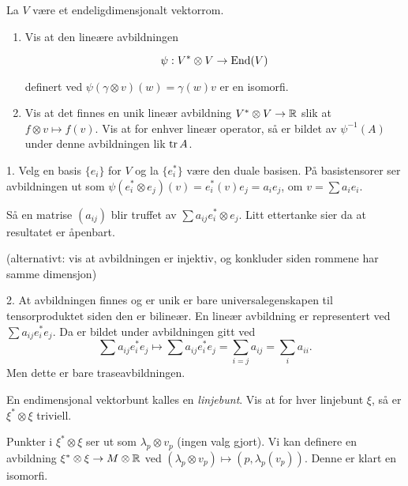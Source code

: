\documentclass[11pt, english]{article}
\begin{document}
\begin{oppg}
La $V$ være et endeligdimensjonalt vektorrom. 
\begin{enumerate}
\item Vis at den lineære avbildningen

\[
\psi: V^\ast \otimes V \to \operatorname{End}(V)
\]

definert ved $\psi(\gamma \otimes v)(w) = \gamma(w) v$ er en isomorfi.
\item Vis at det finnes en unik lineær avbildning $V^\ast \otimes V \to \mathbb{R}$ slik at $f \otimes v \mapsto f(v)$. Vis at for enhver lineær operator, så er bildet av $\psi^{-1}(A)$  under denne avbildningen lik $\operatorname{tr} A$.
\end{enumerate}
\end{oppg}

\begin{losn}
1. Velg en basis $\{ e_i \}$ for $V$ og la $\{ e_i^\ast \}$ være den duale basisen. På basistensorer ser avbildningen ut som $\psi(e_i^\ast \otimes e_j)(v) = e_i^\ast(v) e_j = a_i e_j$, om $v = \sum a_i e_i$. 

Så en matrise $(a_{ij})$ blir truffet av $\sum a_{ij} e_i^\ast \otimes e_j$. Litt ettertanke sier da at resultatet er åpenbart.

(alternativt: vis at avbildningen er injektiv, og konkluder siden rommene har samme dimensjon)

2. At avbildningen finnes og er unik er bare universalegenskapen til tensorproduktet siden den er bilineær. En lineær avbildning er representert ved $\sum a_{ij} e_i^\ast e_j$. Da er bildet under avbildningen gitt ved
$$
\sum a_{ij} e_i^\ast e_j \mapsto \sum a_{ij} e_i^\ast e_j = \sum_{i=j} a_{ij} = \sum_i a_{ii}.
$$
Men dette er bare traseavbildningen.
\end{losn}

\begin{oppg}[7]
En endimensjonal vektorbunt kalles en \emph{linjebunt}. Vis at for hver linjebunt $\xi$, så er $\xi^\ast \otimes \xi$ triviell.
\end{oppg}
\begin{losn}
Punkter i $\xi^\ast \otimes \xi$ ser ut som $\lambda_p \otimes v_p$ (ingen valg gjort). Vi kan definere en avbildning $\xi^\ast \otimes \xi \to M \otimes \mathbb{R}$ ved $(\lambda_p \otimes v_p) \mapsto (p,\lambda_p(v_p))$. Denne er klart en isomorfi.
\end{losn}
\end{document}
